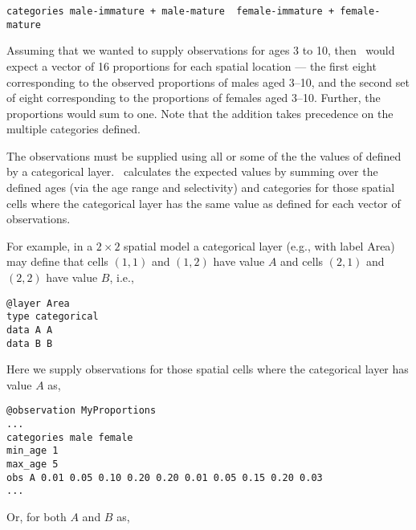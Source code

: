 {\small{\begin{verbatim}
categories male-immature + male-mature  female-immature + female-mature
\end{verbatim}}}

Assuming that we wanted to supply observations for ages 3 to 10, then \SPM\ would expect a vector of 16 proportions for each spatial location --- the first eight corresponding to the observed proportions of males aged 3--10, and the second set of eight corresponding to the proportions of females aged 3--10. Further, the proportions would sum to one. Note that the addition takes precedence on the multiple categories defined. 

The observations must be supplied using all or some of the the values of defined by a categorical layer. \SPM\ calculates the expected values by summing over the defined ages (via the age range and selectivity) and categories for those spatial cells where the categorical layer has the same value as defined for each vector of observations.

For example, in a $2 \times 2$ spatial model a categorical layer (e.g., with label Area) may define that cells $(1,1)$ and $(1,2)$ have value $A$ and cells $(2,1)$ and $(2,2)$ have value $B$, i.e.,

{\small{\begin{verbatim}
@layer Area
type categorical
data A A 
data B B
\end{verbatim}}}

Here we supply observations for those spatial cells where the categorical layer has value $A$ as, 

{\small{\begin{verbatim}
@observation MyProportions
...
categories male female
min_age 1
max_age 5
obs A 0.01 0.05 0.10 0.20 0.20 0.01 0.05 0.15 0.20 0.03
...
\end{verbatim}}}

Or, for both $A$ and $B$ as,

